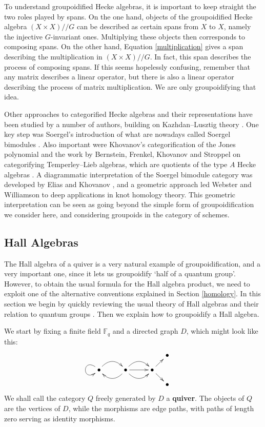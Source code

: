 \documentclass{article}
\newcommand{\F}{{\mathbb F}}
\begin{document}
To understand groupoidified Hecke algebras, it is important to keep
straight the two roles played by spans.  On the one hand, objects of
the groupoidified Hecke algebra $(X \times X)/\!/G$ can be described
as certain spans from $X$ to $X$, namely the injective $G$-invariant
ones.  Multiplying these objects then corresponds to composing spans.
On the other hand, Equation \ref{multiplication} gives a span describing the
multiplication in $(X \times X)/\!/G$.  In fact, this span
describes the process of composing spans.  If this seems hopelessly
confusing, remember that any matrix describes a linear operator, but
there is also a linear operator describing the process of matrix
multiplication.  We are only groupoidifying that idea.

Other approaches to categorified Hecke algebras and their
representations have been studied by a number of authors, building on
Kazhdan--Lusztig theory \cite{KaLu}.  One key step was Soergel's
introduction of what are nowadays called Soergel bimodules
\cite{Rou,Soergel}.  Also important were Khovanov's categorification
of the Jones polynomial \cite{Kh} and the work by Bernstein, Frenkel,
Khovanov and Stroppel on categorifying Temperley--Lieb algebras,
which are quotients of the type $A$ Hecke algebras
\cite{BFK,Stroppel}.  A diagrammatic interpretation of the Soergel
bimodule category was developed by Elias and Khovanov \cite{ElKh}, and
a geometric approach led Webster and Williamson \cite{WW} to deep
applications in knot homology theory.  This geometric interpretation
can be seen as going beyond the simple form of groupoidification we
consider here, and considering groupoids in the category of schemes.

\subsection{Hall Algebras}\label{hall}

The Hall algebra of a quiver is a very natural example of
groupoidification, and a very important one, since it lets us 
groupoidify `half of a quantum group'.  However, to obtain the usual
formula for the Hall algebra product, we need to exploit one of the
alternative conventions explained in Section \ref{homology}.  In this
section we begin by quickly reviewing the usual theory of Hall
algebras and their relation to quantum groups \cite{Hubery,Schiffman}.
Then we explain how to groupoidify a Hall algebra.

We start by fixing a finite field $\F_q$ and a directed graph $D$, 
which might look like this:
\[ \xymatrix@=10pt{
 &&&&& \bullet  \\
 \bullet \ar@(ul,dl)[] \ar@/^1pc/[rr]
 && \bullet \ar@/^1pc/[ll] \ar@/^1pc/[rr] \ar@/_1pc/[rr] \ar[rr]
 && \bullet \ar[ur] \ar[dr] \\
 &&&&& \bullet  
 }
\]
We shall call the category $Q$ freely generated by $D$ a \textbf{quiver}.
The objects of $Q$ are the vertices of $D$, while the morphisms are
edge paths, with paths of length zero serving as identity morphisms.
\end{document}
